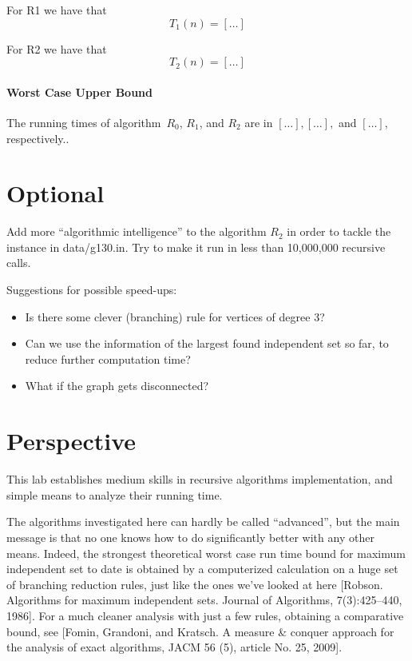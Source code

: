 \documentclass{tufte-handout}
\begin{document}
For R1 we have that
 \[
 T_1(n)=[\ldots]
 \]

For R2 we have that
 \[
 T_2(n)=[\ldots]
 \]
\paragraph{Worst Case Upper Bound}
The running times of algorithm~$R_0$, $R_1$, and $R_2$ are in
$[\ldots],[\ldots],$ and $[\ldots]$, respectively.. \newpage

\section{Optional}
Add more ``algorithmic intelligence'' to the algorithm $R_2$ in order to tackle the instance in data/g130.in.
Try to make it run in less than 10,000,000 recursive calls. 

Suggestions for possible speed-ups:
\begin{itemize}
\item Is there some clever (branching) rule for vertices of degree 3?
\item Can we use the information of the largest found independent set so far, to reduce further computation time?
\item What if the graph gets disconnected?
\end{itemize}

\newpage
\section{ Perspective}

This lab establishes medium skills in recursive algorithms implementation,
and simple means to analyze their running time.

\bigskip

The algorithms investigated here can hardly be called ``advanced'', but the main message 
is that no one knows how to do significantly better with any other means.
Indeed, the strongest theoretical worst case run time bound for maximum independent set to date
is obtained by a computerized calculation on a huge set of branching reduction rules, just like the ones we've looked at here [Robson. Algorithms for maximum independent sets. Journal of Algorithms, 7(3):425--440, 1986]. For a much cleaner analysis with just a few rules, obtaining a comparative bound, see [Fomin, Grandoni, and Kratsch. A measure \& conquer approach for the analysis of exact algorithms, JACM 56 (5), article No. 25, 2009].
\end{document}

